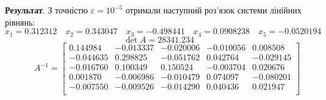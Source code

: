 \documentclass[14pt,a4paper]{scrartcl}
\theoremstyle{definition}
\theoremstyle{remark}
\theoremstyle{definition}
\theoremstyle{definition}
\begin{document}
\textbf{Результат}. З точністю $\varepsilon = 10^{-5} $ отримали наступний роз'язок системи лінійних рівнянь:
$$
x_1=0.312312 \quad
x_2=0.343047 \quad
x_3=-0.498441 \quad
x_4=0.0908238 \quad
x_5=-0.0520194 \quad
$$
$$
\det A = 28341.234$$$$ \qquad A^{-1} = \begin{bmatrix}
0.144984   &  -0.013337  &   -0.020006  &   -0.010056  &   0.008508\\
-0.044635   &  0.298825   &  -0.051762  &   0.042764 &    -0.029145\\
-0.016760  &   0.100349   &  0.150524   &  -0.003704 &   0.020676\\
0.001870  &   -0.006986  &   -0.010479  &   0.074097   &  -0.080201\\
-0.007550  &  -0.009526  &  -0.014290   &  0.040436  &   0.021947 \\
\end{bmatrix}
$$
\end{document}
